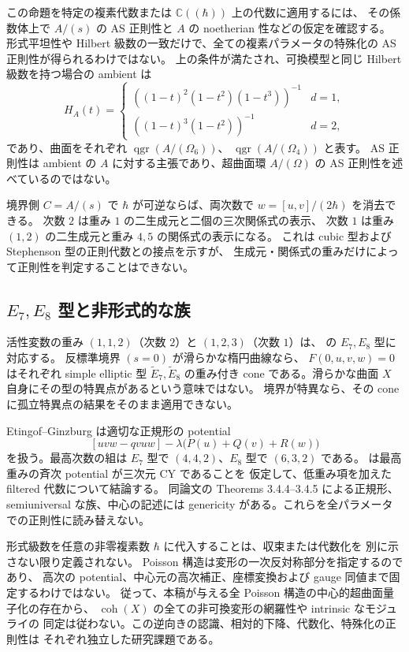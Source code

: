 この命題を特定の複素代数または $\mathbb C((\hbar))$ 上の代数に適用するには、
その係数体上で $A/(s)$ の AS 正則性と $A$ の noetherian 性などの仮定を確認する。
形式平坦性や Hilbert 級数の一致だけで、全ての複素パラメータの特殊化の
AS 正則性が得られるわけではない。
上の条件が満たされ、可換模型と同じ Hilbert 級数を持つ場合の ambient は
\[
 H_A(t)=
 \begin{cases}
 ((1-t)^2(1-t^2)(1-t^3))^{-1}&d=1,\\
 ((1-t)^3(1-t^2))^{-1}&d=2,
 \end{cases}
\]
であり、曲面をそれぞれ $\operatorname{qgr}(A/(\Omega_6))$、
$\operatorname{qgr}(A/(\Omega_4))$ と表す。
AS 正則性は ambient の $A$ に対する主張であり、超曲面環 $A/(\Omega)$ の
AS 正則性を述べているのではない。

境界側 $C=A/(s)$ で $\hbar$ が可逆ならば、両次数で
$w=[u,v]/(2\hbar)$ を消去できる。
次数 $2$ は重み $1$ の二生成元と二個の三次関係式の表示、
次数 $1$ は重み $(1,2)$ の二生成元と重み $4,5$ の関係式の表示になる。
これは cubic 型および Stephenson 型の正則代数との接点を示すが、
生成元・関係式の重みだけによって正則性を判定することはできない。

\subsection{\texorpdfstring{$E_7,E_8$}{E7, E8} 型と非形式的な族}

活性変数の重み $(1,1,2)$（次数 $2$）と $(1,2,3)$（次数 $1$）は、
\cite[\S\S2.3, 3.4]{EG2010}の $E_7,E_8$ 型に対応する。
反標準境界 $(s=0)$ が滑らかな楕円曲線なら、
$F(0,u,v,w)=0$ はそれぞれ simple elliptic 型 $\widetilde E_7,\widetilde E_8$
の重み付き cone である。滑らかな曲面 $X$ 自身にその型の特異点があるという意味ではない。
境界が特異なら、その cone に孤立特異点の結果をそのまま適用できない。

Etingof--Ginzburg は適切な正規形の potential
\[
 [uvw-qvuw]-\lambda\bigl(P(u)+Q(v)+R(w)\bigr)
\]
を扱う。最高次数の組は $E_7$ 型で $(4,4,2)$、$E_8$ 型で $(6,3,2)$ である。
\cite[Theorem 3.3.2]{EG2010} は最高重みの斉次 potential が三次元 CY であることを
仮定して、低重み項を加えた filtered 代数について結論する。
同論文の Theorems 3.4.4--3.4.5 による正規形、semiuniversal な族、中心の記述には
genericity がある。これらを全パラメータでの正則性に読み替えない。

形式級数を任意の非零複素数 $\hbar$ に代入することは、収束または代数化を
別に示さない限り定義されない。
Poisson 構造は変形の一次反対称部分を指定するのであり、
高次の potential、中心元の高次補正、座標変換および gauge 同値まで固定するわけではない。
従って、本稿が与える全 Poisson 構造の中心的超曲面量子化の存在から、
$\operatorname{coh}(X)$ の全ての非可換変形の網羅性や intrinsic なモジュライの
同定は従わない。この逆向きの認識、相対的下降、代数化、特殊化の正則性は
それぞれ独立した研究課題である。
